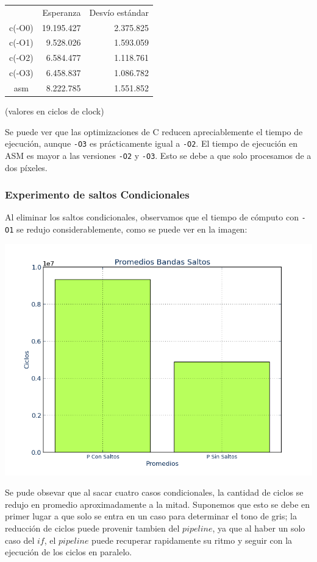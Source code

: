 \documentclass[a4paper]{article}
\begin{document}
\begin{tabular}{c|r|r} %
 & Esperanza & Desvío estándar \\
 c(-O0) & 19.195.427 & 2.375.825 \\
 c(-O1) & 9.528.026 & 1.593.059 \\
 c(-O2) & 6.584.477 & 1.118.761 \\
 c(-O3) & 6.458.837 & 1.086.782 \\
 asm & 8.222.785 & 1.551.852
\end{tabular}
(valores en ciclos de clock)


\smallskip
Se puede ver que las optimizaciones de C reducen apreciablemente el tiempo de ejecución, aunque \texttt{-O3} es prácticamente igual a \texttt{-O2}. El tiempo de ejecución en ASM es mayor a las versiones \texttt{-O2} y \texttt{-O3}. Esto se debe a que solo procesamos de a dos píxeles.

\subsubsection{Experimento de saltos Condicionales}

Al eliminar los saltos condicionales, observamos que el tiempo de cómputo con \texttt{-O1} se redujo considerablemente, como se puede ver en la imagen:

\includegraphics[scale=0.5]{imagenes/PromedioSaltos.png}

Se pude obsevar que al sacar cuatro casos condicionales, la cantidad de ciclos se redujo en promedio aproximadamente a la mitad. Suponemos que esto se debe en primer lugar a que solo se entra en un caso para determinar el tono de gris; la reducción de ciclos puede provenir tambien del $pipeline$, ya que al haber un solo caso del $if$, el $pipeline$ puede recuperar rapidamente su ritmo y seguir con la ejecución de los ciclos en paralelo.
\end{document}
